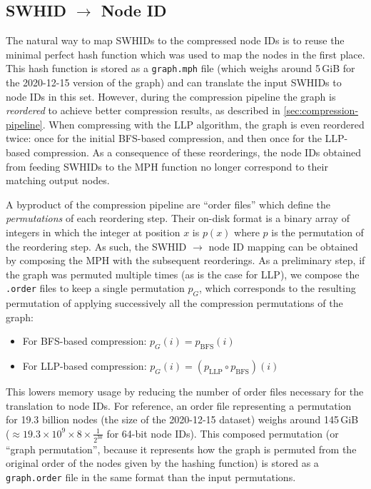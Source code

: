 \subsection{SWHID $\to$ Node ID}%
\label{sec:swhid2node}

The natural way to map \glspl{SWHID} to the compressed node IDs is to reuse the
minimal perfect hash function which was used to map the nodes in the first
place.
This hash function is stored as a \texttt{graph.mph} file (which weighs
around 5\,GiB for the 2020-12-15 version of the graph) and can translate the
input \glspl{SWHID} to node IDs in this set. However, during the compression
pipeline the graph is \emph{reordered} to achieve better compression results,
as described in \cref{sec:compression-pipeline}. When compressing with the
\gls{LLP} algorithm, the graph is even reordered twice: once for the initial
BFS-based compression, and then once for the LLP-based compression. As a
consequence of these reorderings, the node IDs obtained from feeding
\glspl{SWHID} to the \gls{MPH} function no longer correspond to their matching
output nodes.

A byproduct of the compression pipeline are ``order files'' which define
the \emph{permutations} of each reordering step. Their on-disk format is a
binary array of integers in which the integer at position $x$ is $p(x)$ where
$p$ is the permutation of the reordering step. As such, the \gls{SWHID} $\to$
node ID mapping can be obtained by composing the \gls{MPH} with the subsequent
reorderings. As a preliminary step, if the graph was permuted multiple times
(as is the case for \gls{LLP}), we compose the \texttt{.order} files to keep a
single permutation $p_G$, which corresponds to the resulting permutation of
applying successively all the compression permutations of the graph:

\begin{itemize}
    \item For BFS-based compression: $p_G(i) = p_{\mathrm{BFS}}(i)$
    \item For LLP-based compression:
        $p_G(i) = (p_{\mathrm{LLP}} \circ p_{\mathrm{BFS}})(i)$
\end{itemize}

This lowers memory usage by reducing the number of order files necessary for
the translation to node IDs. For reference, an order file representing a
permutation for 19.3 billion nodes (the size of the 2020-12-15 dataset) weighs
around 145\,GiB ($\approx 19.3 \times 10^9 \times 8 \times \frac{1}{2^{30}}$
for 64-bit node IDs).
This composed permutation (or ``graph permutation'', because it represents how
the graph is permuted from the original order of the nodes given by the hashing
function) is stored as a \texttt{graph.order} file in the same format than the
input permutations.

